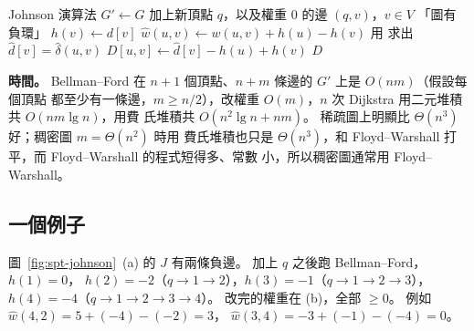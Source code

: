 \begin{pseudo}[label=alg:spt-johnson]{Johnson 演算法}
    \State $G' \gets G$ 加上新頂點 $q$，以及權重 $0$ 的邊 $(q, v)$，$v \in V$
        \State \Return 「圖有負環」
    \EndIf
        \State $h(v) \gets d[v]$ 
    \EndFor
        \State $\hat{w}(u, v) \gets w(u, v) + h(u) - h(v)$
    \EndFor
        \State 用  求出 $\hat{d}[v] = \hat{\delta}(u, v)$
            \State $D[u, v] \gets \hat{d}[v] - h(u) + h(v)$ 
        \EndFor
    \EndFor
    \State \Return $D$
\EndFunction
\end{pseudo}

\textbf{時間。} Bellman--Ford 在 $n + 1$ 個頂點、$n + m$ 條邊的 $G'$ 上是 $O(nm)$（假設每個頂點
都至少有一條邊，$m \ge n/2$），改權重 $O(m)$，$n$ 次 Dijkstra 用二元堆積共 $O(nm \lg n)$，用費
氏堆積共 $O(n^2 \lg n + nm)$。 稀疏圖上明顯比 $\Theta(n^3)$ 好；稠密圖 $m = \Theta(n^2)$ 時用
費氏堆積也只是 $\Theta(n^3)$，和 Floyd--Warshall 打平，而 Floyd--Warshall 的程式短得多、常數
小，所以稠密圖通常用 Floyd--Warshall。

\subsection{一個例子}

圖~\ref{fig:spt-johnson}~(a) 的 $J$ 有兩條負邊。 加上 $q$ 之後跑 Bellman--Ford，$h(1) = 0$，
$h(2) = -2$（$q \to 1 \to 2$），$h(3) = -1$（$q \to 1 \to 2 \to 3$），$h(4) = -4$（$q \to 1 \to 2
\to 3 \to 4$）。 改完的權重在 (b)，全部 $\ge 0$。 例如 $\hat{w}(4, 2) = 5 + (-4) - (-2) = 3$，
$\hat{w}(3, 4) = -3 + (-1) - (-4) = 0$。

